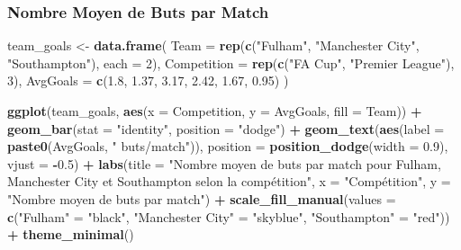 \documentclass[
]{article}
\newenvironment{Shaded}{\begin{snugshade}}{\end{snugshade}}
\newcommand{\AttributeTok}[1]{\textcolor[rgb]{0.13,0.29,0.53}{#1}}
\newcommand{\DecValTok}[1]{\textcolor[rgb]{0.00,0.00,0.81}{#1}}
\newcommand{\FloatTok}[1]{\textcolor[rgb]{0.00,0.00,0.81}{#1}}
\newcommand{\FunctionTok}[1]{\textcolor[rgb]{0.13,0.29,0.53}{\textbf{#1}}}
\newcommand{\NormalTok}[1]{#1}
\newcommand{\OtherTok}[1]{\textcolor[rgb]{0.56,0.35,0.01}{#1}}
\newcommand{\SpecialCharTok}[1]{\textcolor[rgb]{0.81,0.36,0.00}{\textbf{#1}}}
\newcommand{\StringTok}[1]{\textcolor[rgb]{0.31,0.60,0.02}{#1}}
\begin{document}
\subsubsection{Nombre Moyen de Buts par
Match}\label{nombre-moyen-de-buts-par-match}

\begin{Shaded}
\begin{Highlighting}[]
\NormalTok{team\_goals }\OtherTok{\textless{}{-}} \FunctionTok{data.frame}\NormalTok{(}
  \AttributeTok{Team =} \FunctionTok{rep}\NormalTok{(}\FunctionTok{c}\NormalTok{(}\StringTok{"Fulham"}\NormalTok{, }\StringTok{"Manchester City"}\NormalTok{, }\StringTok{"Southampton"}\NormalTok{), }\AttributeTok{each =} \DecValTok{2}\NormalTok{),}
  \AttributeTok{Competition =} \FunctionTok{rep}\NormalTok{(}\FunctionTok{c}\NormalTok{(}\StringTok{"FA Cup"}\NormalTok{, }\StringTok{"Premier League"}\NormalTok{), }\DecValTok{3}\NormalTok{),}
  \AttributeTok{AvgGoals =} \FunctionTok{c}\NormalTok{(}\FloatTok{1.8}\NormalTok{, }\FloatTok{1.37}\NormalTok{, }\FloatTok{3.17}\NormalTok{, }\FloatTok{2.42}\NormalTok{, }\FloatTok{1.67}\NormalTok{, }\FloatTok{0.95}\NormalTok{)}
\NormalTok{)}

\FunctionTok{ggplot}\NormalTok{(team\_goals, }\FunctionTok{aes}\NormalTok{(}\AttributeTok{x =}\NormalTok{ Competition, }\AttributeTok{y =}\NormalTok{ AvgGoals, }\AttributeTok{fill =}\NormalTok{ Team)) }\SpecialCharTok{+}
  \FunctionTok{geom\_bar}\NormalTok{(}\AttributeTok{stat =} \StringTok{"identity"}\NormalTok{, }\AttributeTok{position =} \StringTok{"dodge"}\NormalTok{) }\SpecialCharTok{+}
  \FunctionTok{geom\_text}\NormalTok{(}\FunctionTok{aes}\NormalTok{(}\AttributeTok{label =} \FunctionTok{paste0}\NormalTok{(AvgGoals, }\StringTok{" buts/match"}\NormalTok{)), }\AttributeTok{position =} \FunctionTok{position\_dodge}\NormalTok{(}\AttributeTok{width =} \FloatTok{0.9}\NormalTok{), }\AttributeTok{vjust =} \SpecialCharTok{{-}}\FloatTok{0.5}\NormalTok{) }\SpecialCharTok{+}
  \FunctionTok{labs}\NormalTok{(}\AttributeTok{title =} \StringTok{"Nombre moyen de buts par match pour Fulham, Manchester City et Southampton selon la compétition"}\NormalTok{,}
       \AttributeTok{x =} \StringTok{"Compétition"}\NormalTok{, }\AttributeTok{y =} \StringTok{"Nombre moyen de buts par match"}\NormalTok{) }\SpecialCharTok{+}
  \FunctionTok{scale\_fill\_manual}\NormalTok{(}\AttributeTok{values =} \FunctionTok{c}\NormalTok{(}\StringTok{"Fulham"} \OtherTok{=} \StringTok{"black"}\NormalTok{, }\StringTok{"Manchester City"} \OtherTok{=} \StringTok{"skyblue"}\NormalTok{, }\StringTok{"Southampton"} \OtherTok{=} \StringTok{"red"}\NormalTok{)) }\SpecialCharTok{+}
  \FunctionTok{theme\_minimal}\NormalTok{()}
\end{Highlighting}
\end{Shaded}
\end{document}
